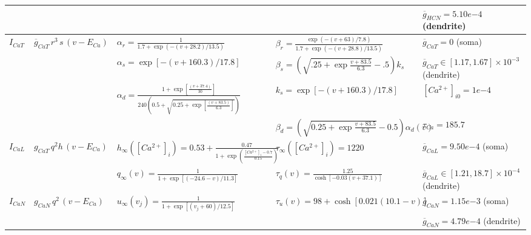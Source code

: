 \begin{table}[ht]
\begin{adjustbox}{width=\textwidth}
\begin{tabular}{lllll}
 &  &  &  & $ \overline{g}_{HCN} = 5.10 e{-4} $ (dendrite) \\ \midrule
$ I_{CaT} $ & $ \overline{g}_{CaT} \, r^3 \, s \, (v - E_{Ca}) $ & $ \alpha _ { r } = \frac { 1 } { 1.7 + \exp \left( − \left( v + 28.2 \right) / 13.5 \right) } $ & $ \beta _ { r } = \frac { \exp \left( − \left( v + 63 \right) / 7.8 \right) } { 1.7 + \exp \left( − \left( v + 28.8 \right) / 13.5 \right) } $ & $ \overline{g}_{CaT} = 0 $ (soma) \\
 &  & $ \alpha _ { s } = \exp \left[ − \left( v + 160.3 \right) / 17.8 \right] $ & $ \beta _ { s } = \left( \sqrt { .25 + \exp \frac{ v + 83.5 } { 6.3 } } − .5 \right) k_s $ & $ \overline{g}_{CaT} \in \left[ 1.17 , 1.67 \right] \times 10^{−3} $ (dendrite) \\
 &  & $ \alpha _ { d } = \frac { 1 + \exp \left[ \frac{ \left( v + 37.4 \right) }{ 30 } \right] } { 240 \left( 0.5 + \sqrt{ 0.25 + \exp \left[ \frac{ \left( v + 83.5 \right) }{ 6.3 } \right] } \right) } $ & $ k_s = \exp \left[ − \left( v + 160.3 \right) / 17.8 \right] $ & $ \left[  Ca  ^ { 2 + } \right] _ { i0 } = 1 e{-4} $ \\
 &  &  & $ \beta _ { d } = \left( \sqrt { 0.25 + \exp \frac{ v + 83.5 } { 6.3 } } − 0.5 \right) \alpha _ { d } \left( v \right) $ & $ \tau _ {  Ca } = 185.7 $ \\ \midrule
$ I_{CaL} $ & $ g_{CaT} \, q^{ 2 } h \, (v - E_{Ca})$ & $ h_{ \infty } ( \scriptstyle{ \left[  Ca  ^ { 2 + } \right] _ { i } } ) = 0.53 + \frac{ 0.47 }{ 1 + \exp ( \frac{ \scriptstyle{ \left[  Ca  ^ { 2 + } \right] _ { i } } − 0.7 }{ 0.15 } ) } $ & $ \tau _ { \infty } \left( \scriptstyle{ \left[  Ca  ^ { 2 + } \right] _ { i } } \right) = 1220 $ & $ \overline{g}_{CaL} = 9.50 e{-4} $ (soma) \\
 &  & $ q _ { \infty } \left( v \right) = \frac { 1 } { 1 + \exp \left[ \left( − 24.6 − v \right) / 11.3 \right] } $ & $ \tau _ { q } \left( v \right) = \frac { 1.25 } { \cosh \left[ − 0.03 \left( v + 37.1 \right) \right] } $ & $ \overline{g}_{CaL} \in \left[ 1.21 , 18.7  \right] \times 10^{−4} $ (dendrite) \\ \midrule
$ I_{CaN} $ & $ g _ { CaN } \, q^{2} \, (v - E_{Ca})  $ & $ u _ { \infty } \left( v _ { j } \right) = \frac { 1 } { 1 + \exp \left[ \left( v _ { j } + 60 \right) / 12.5 \right] } $ & $ \tau _ {  u  } \left( v \right) = 98 + \cosh \left[ 0.021 \left( 10.1 − v \right) \right] $ & $ \overline{g}_{CaN} = 1.15 e{-3} $ (soma) \\
 &  &  &  & $ \overline{g}_{CaN} = 4.79 e{-4} $ (dendrite) \\ \bottomrule
\end{tabular}
\end{adjustbox}
%
%
\label{tab:stn_ionic_currents}
\end{table}

